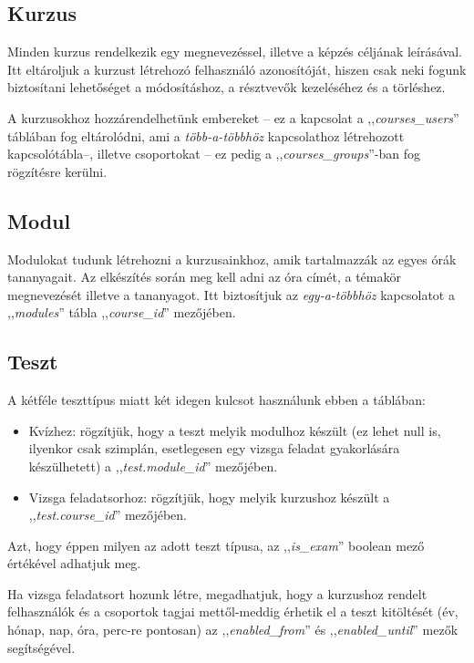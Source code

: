 \documentclass[
]{thesis-ekf}
\theoremstyle{definition}
\theoremstyle{remark}
\begin{document}
                \subsection{Kurzus}
                    Minden kurzus rendelkezik egy megnevezéssel, illetve a képzés céljának leírásával. Itt eltároljuk a kurzust létrehozó felhasználó azonosítóját, hiszen csak neki fogunk biztosítani lehetőséget a módosításhoz, a résztvevők kezeléséhez és a törléshez.

                    A kurzusokhoz hozzárendelhetünk embereket -- ez a kapcsolat a ,,\emph{courses\_users}'' táblában fog eltárolódni, ami a \emph{több-a-többhöz} kapcsolathoz létrehozott kapcsolótábla--, illetve csoportokat -- ez pedig a ,,\emph{courses\_groups}''-ban fog rögzítésre kerülni.
                \subsection{Modul}
                    Modulokat tudunk létrehozni a kurzusainkhoz, amik tartalmazzák az egyes órák tananyagait. Az elkészítés során meg kell adni az óra címét, a témakör megnevezését illetve a tananyagot. Itt biztosítjuk az \emph{egy-a-többhöz} kapcsolatot a ,,\emph{modules}'' tábla ,,\emph{course\_id}'' mezőjében.
                \subsection{Teszt} \label{Test-structure}
                    A kétféle teszttípus miatt két idegen kulcsot használunk ebben a táblában: 
                    \begin{itemize}
                        \item Kvízhez: rögzítjük, hogy a teszt melyik modulhoz készült (ez lehet null is, ilyenkor csak szimplán, esetlegesen egy vizsga feladat gyakorlására készülhetett) a ,,\emph{test.module\_id}'' mezőjében.
                        \item Vizsga feladatsorhoz: rögzítjük, hogy melyik kurzushoz készült a ,,\emph{test.course\_id}'' mezőjében.
                    \end{itemize} 
                    Azt, hogy éppen milyen az adott teszt típusa, az ,,\emph{is\_exam}'' boolean mező értékével adhatjuk meg.
                    
                    Ha vizsga feladatsort hozunk létre, megadhatjuk, hogy a kurzushoz rendelt felhasználók és a csoportok tagjai mettől-meddig érhetik el a teszt kitöltését (év, hónap, nap, óra, perc-re pontosan) az ,,\emph{enabled\_from}'' és ,,\emph{enabled\_until}'' mezők segítségével.
\end{document}
